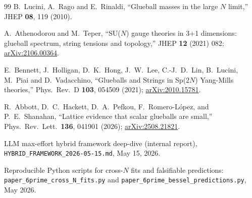 \documentclass[reprint,prd,amsmath,amssymb,nofootinbib,superscriptaddress]{revtex4-2}
\begin{document}
\begin{thebibliography}{99}
  B.~Lucini, A.~Rago and E.~Rinaldi,
  ``Glueball masses in the large $N$ limit,''
  JHEP \textbf{08}, 119 (2010).

  A.~Athenodorou and M.~Teper,
  ``SU($N$) gauge theories in 3+1 dimensions: glueball spectrum, string tensions and topology,''
  JHEP \textbf{12} (2021) 082;
  \href{https://arxiv.org/abs/2106.00364}{arXiv:2106.00364}.

  E.~Bennett, J.~Holligan, D.~K.~Hong, J.~W.~Lee, C.-J.~D.~Lin, B.~Lucini, M.~Piai and D.~Vadacchino,
  ``Glueballs and Strings in Sp($2N$) Yang-Mills theories,''
  Phys.\ Rev.\ D \textbf{103}, 054509 (2021);
  \href{https://arxiv.org/abs/2010.15781}{arXiv:2010.15781}.

  R.~Abbott, D.~C.~Hackett, D.~A.~Pefkou, F.~Romero-L\'opez, and P.~E.~Shanahan,
  ``Lattice evidence that scalar glueballs are small,''
  Phys.\ Rev.\ Lett.\ \textbf{136}, 041901 (2026);
  \href{https://arxiv.org/abs/2508.21821}{arXiv:2508.21821}.

  LLM max-effort hybrid framework deep-dive (internal report),
  \texttt{HYBRID\_FRAMEWORK\_2026-05-15.md}, May 15, 2026.

  Reproducible Python scripts for cross-$N$ fits and falsifiable predictions:
  \texttt{paper\_6prime\_cross\_N\_fits.py} and \texttt{paper\_6prime\_bessel\_predictions.py},
  May 2026.

\end{thebibliography}
\end{document}
